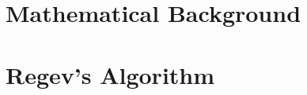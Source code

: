 \documentclass[11pt, twoside, a4paper]{report}
\begin{document}




\part{Mathematical Background}









\part{Regev's Algorithm}








\clearpage
{}

\renewcommand{\bibname}{BIBLIOGRAPHY}




\end{document}
